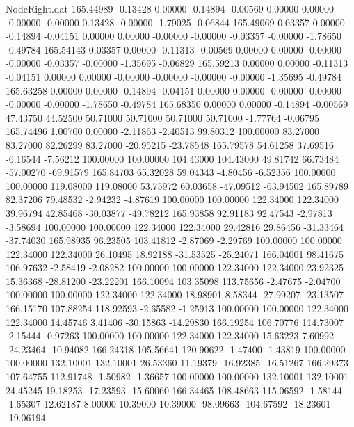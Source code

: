 \begin{filecontents}{NodeRight.dat}
 165.44989   -0.13428    0.00000    -0.14894   -0.00569    0.00000    0.00000   -0.00000   -0.00000    0.13428   -0.00000   -1.79025   -0.06844
 165.49069    0.03357    0.00000    -0.14894   -0.04151    0.00000    0.00000   -0.00000   -0.00000   -0.03357   -0.00000   -1.78650   -0.49784
 165.54143    0.03357    0.00000    -0.11313   -0.00569    0.00000    0.00000   -0.00000   -0.00000   -0.03357   -0.00000   -1.35695   -0.06829
 165.59213    0.00000    0.00000    -0.11313   -0.04151    0.00000    0.00000   -0.00000   -0.00000   -0.00000   -0.00000   -1.35695   -0.49784
 165.63258    0.00000    0.00000    -0.14894   -0.04151    0.00000    0.00000   -0.00000   -0.00000   -0.00000   -0.00000   -1.78650   -0.49784
 165.68350    0.00000    0.00000    -0.14894   -0.00569   47.43750   44.52500   50.71000   50.71000   50.71000   50.71000   -1.77764   -0.06795
 165.74496    1.00700    0.00000    -2.11863   -2.40513   99.80312  100.00000   83.27000   83.27000   82.26299   83.27000  -20.95215  -23.78548
 165.79578   54.61258   37.69516    -6.16544   -7.56212  100.00000  100.00000  104.43000  104.43000   49.81742   66.73484  -57.00270  -69.91579
 165.84703   65.32028   59.04343    -4.80456   -6.52356  100.00000  100.00000  119.08000  119.08000   53.75972   60.03658  -47.09512  -63.94502
 165.89789   82.37206   79.48532    -2.94232   -4.87619  100.00000  100.00000  122.34000  122.34000   39.96794   42.85468  -30.03877  -49.78212
 165.93858   92.91183   92.47543    -2.97813   -3.58694  100.00000  100.00000  122.34000  122.34000   29.42816   29.86456  -31.33464  -37.74030
 165.98935   96.23505  103.41812    -2.87069   -2.29769  100.00000  100.00000  122.34000  122.34000   26.10495   18.92188  -31.53525  -25.24071
 166.04001   98.41675  106.97632    -2.58419   -2.08282  100.00000  100.00000  122.34000  122.34000   23.92325   15.36368  -28.81200  -23.22201
 166.10094  103.35098  113.75656    -2.47675   -2.04700  100.00000  100.00000  122.34000  122.34000   18.98901    8.58344  -27.99207  -23.13507
 166.15170  107.88254  118.92593    -2.65582   -1.25913  100.00000  100.00000  122.34000  122.34000   14.45746    3.41406  -30.15863  -14.29830
 166.19254  106.70776  114.73007    -2.15444   -0.97263  100.00000  100.00000  122.34000  122.34000   15.63223    7.60992  -24.23464  -10.94082
 166.24318  105.56641  120.90622    -1.47400   -1.43819  100.00000  100.00000  132.10001  132.10001   26.53360   11.19379  -16.92385  -16.51267
 166.29373  107.64755  112.91748    -1.50982   -1.36657  100.00000  100.00000  132.10001  132.10001   24.45245   19.18253  -17.23593  -15.60060
 166.34465  108.48663  115.06592    -1.58144   -1.65307   12.62187    8.00000   10.39000   10.39000  -98.09663 -104.67592  -18.23601  -19.06194

\end{filecontents}
